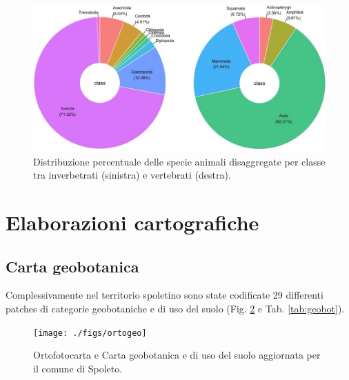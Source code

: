 \documentclass[
  a4paper,
]{book}
\begin{document}
\begin{figure}

{\centering \includegraphics[width=\linewidth]{./figs/faunaSpoletoInv} 

}

\caption{Distribuzione percentuale delle specie animali disaggregate per classe tra inverbetrati (sinistra) e vertebrati (destra).}\label{fig:faunaperc}
\end{figure}

\section{Elaborazioni cartografiche}\label{elaborazioni-cartografiche}

\subsection{Carta geobotanica}\label{carta-geobotanica-1}

Complessivamente nel territorio spoletino sono state codificate 29 differenti patches di categorie geobotaniche e di uso del suolo (Fig. \ref{fig:ortogeo} e Tab.
\ref{tab:geobot}).

\begin{figure}

{\centering \texttt{[image: ./figs/ortogeo]} 

}

\caption{Ortofotocarta e Carta geobotanica e di uso del suolo aggiornata per il comune di Spoleto.}\label{fig:ortogeo}
\end{figure}
\end{document}
